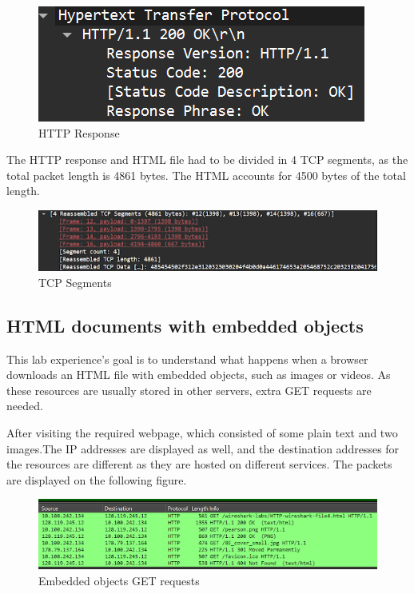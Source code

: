 \begin{figure}[htbp]
    \centering
    \includegraphics[width=1\linewidth]{img/12.png}
    \caption{HTTP Response}\label{fig:12}
\end{figure}

The HTTP response and HTML file had to be divided in 4 TCP segments, as the
total packet length is 4861 bytes. The HTML accounts for 4500 bytes of the
total length.

\begin{figure}[htbp]
    \centering
    \includegraphics[width=1\linewidth]{img/13.png}
    \caption{TCP Segments}\label{fig:13}
\end{figure}

\subsection{HTML documents with embedded objects}
This lab experience's goal is to understand what happens when a browser
downloads an HTML file with embedded objects, such as images or videos. As
these resources are usually stored in other servers, extra GET requests are
needed.

After visiting the required webpage, which consisted of some plain text and two
images.The IP addresses are displayed as well, and the destination addresses
for the resources are different as they are hosted on different services. The
packets are displayed on the following figure.

\begin{figure}[htbp]
    \centering
    \includegraphics[width=1\linewidth]{img/14.png}
    \caption{Embedded objects GET requests}\label{fig:14}
\end{figure}

